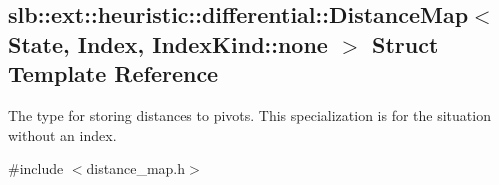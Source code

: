 \hypertarget{structslb_1_1ext_1_1heuristic_1_1differential_1_1DistanceMap_3_01State_00_01Index_00_01IndexKind_1_1none_01_4}{}\subsection{slb\+:\+:ext\+:\+:heuristic\+:\+:differential\+:\+:Distance\+Map$<$ State, Index, Index\+Kind\+:\+:none $>$ Struct Template Reference}
\label{structslb_1_1ext_1_1heuristic_1_1differential_1_1DistanceMap_3_01State_00_01Index_00_01IndexKind_1_1none_01_4}


The type for storing distances to pivots. This specialization is for the situation without an index.  




{\ttfamily \#include $<$distance\+\_\+map.\+h$>$}

